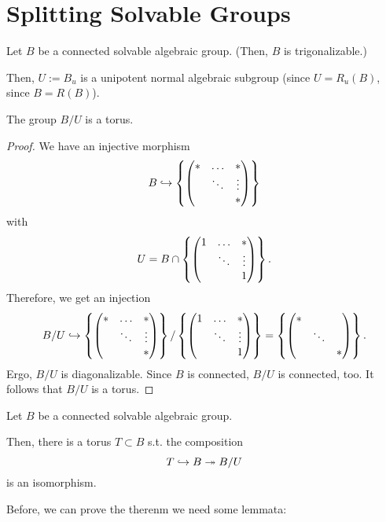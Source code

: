 \section{Splitting Solvable Groups}
Let $B$ be a connected solvable algebraic group. (Then, $B$ is trigonalizable.)

Then, $U := B_u$ is a unipotent normal algebraic subgroup (since $U = R_u(B)$, since $B = R(B)$).

\begin{lemma}
	The group $B / U$ is a torus.
\end{lemma}
\begin{proof}
	We have an injective morphism
	\[ B \overset{}{\hookrightarrow} \left\lbrace\left(\begin{matrix} * & \ldots & * \\  & \ddots & \vdots \\ & & * \end{matrix}\right)\right\rbrace\]
	with
	\[ U = B \cap \left\lbrace\left(\begin{matrix} 1 & \ldots & * \\  & \ddots & \vdots \\ & & 1 \end{matrix}\right)\right\rbrace. \]
	Therefore, we get an injection
	\[B / U \overset{}{\hookrightarrow} \left\lbrace\left(\begin{matrix} * & \ldots & * \\  & \ddots & \vdots \\ & & * \end{matrix}\right)\right\rbrace / \left\lbrace\left(\begin{matrix} 1 & \ldots & * \\  & \ddots & \vdots \\ & & 1 \end{matrix}\right)\right\rbrace = \left\lbrace\left(\begin{matrix} * &  &  \\  & \ddots & \\ & & * \end{matrix}\right)\right\rbrace. \]
	Ergo, $B/U$ is diagonalizable. Since $B$ is connected, $B/U$ is connected, too.
	It follows that $B/U$ is a torus.
\end{proof}

\begin{theorem}
	Let $B$ be a connected solvable algebraic group.
	
	Then, there is a torus $T \subset B$ s.t. the composition
	\[ T \overset{}{\hookrightarrow} B \overset{}{\twoheadrightarrow} B/U \]
	is an isomorphism.
\end{theorem}
Before, we can prove the therenm we need some lemmata:

